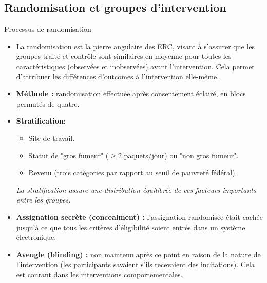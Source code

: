 \documentclass[aspectratio=169,xcolor=dvipsnames]{beamer}
\begin{document}
\subsection{Randomisation et groupes d'intervention}

\begin{frame}{Processus de randomisation}
    \begin{itemize}
        \item La randomisation est la pierre angulaire des ERC, visant à s'assurer que les groupes traité et contrôle sont similaires en moyenne pour toutes les caractéristiques (observées et inobservées) avant l'intervention. Cela permet d'attribuer les différences d'outcomes à l'intervention elle-même.
        \item \textbf{Méthode :} randomisation effectuée après consentement éclairé, en blocs permutés de quatre.
        \item \textbf{Stratification}:
            \begin{itemize}
                \item Site de travail.
                \item Statut de "gros fumeur" ($\ge 2$ paquets/jour) ou "non gros fumeur".
                \item Revenu (trois catégories par rapport au seuil de pauvreté fédéral).
            \end{itemize}
            \textit{La stratification assure une distribution équilibrée de ces facteurs importants entre les groupes.}
        \item \textbf{Assignation secrète (concealment) :} l'assignation randomisée était cachée jusqu'à ce que tous les critères d'éligibilité soient entrés dans un système électronique.
        \item \textbf{Aveugle (blinding) :} non maintenu après ce point en raison de la nature de l'intervention (les participants savaient s'ils recevaient des incitations). Cela est courant dans les interventions comportementales.
    \end{itemize}
\end{frame}
\end{document}
